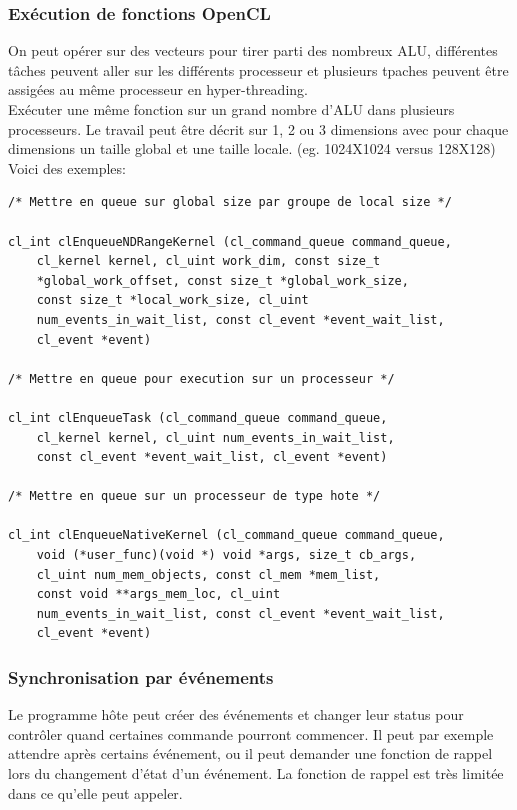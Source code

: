\documentclass[oneside]{book}
\begin{document}
\subsubsection{Exécution de fonctions OpenCL}
On peut opérer sur des vecteurs pour tirer parti des nombreux ALU, différentes tâches peuvent aller sur les différents processeur et plusieurs tpaches peuvent être assigées au même processeur en hyper-threading.\\

 Exécuter une même fonction sur un grand nombre d'ALU dans plusieurs processeurs. Le travail peut être décrit sur 1, 2 ou 3 dimensions avec pour chaque dimensions un taille global et une taille locale. (eg. 1024X1024 versus 128X128)\\
 
Voici des exemples:
\begin{lstlisting}
/* Mettre en queue sur global size par groupe de local size */

cl_int clEnqueueNDRangeKernel (cl_command_queue command_queue,
	cl_kernel kernel, cl_uint work_dim, const size_t
	*global_work_offset, const size_t *global_work_size,
	const size_t *local_work_size, cl_uint
	num_events_in_wait_list, const cl_event *event_wait_list,
	cl_event *event)

/* Mettre en queue pour execution sur un processeur */

cl_int clEnqueueTask (cl_command_queue command_queue,
	cl_kernel kernel, cl_uint num_events_in_wait_list,
	const cl_event *event_wait_list, cl_event *event)

/* Mettre en queue sur un processeur de type hote */

cl_int clEnqueueNativeKernel (cl_command_queue command_queue,
	void (*user_func)(void *) void *args, size_t cb_args,
	cl_uint num_mem_objects, const cl_mem *mem_list,
	const void **args_mem_loc, cl_uint
	num_events_in_wait_list, const cl_event *event_wait_list,
	cl_event *event)
\end{lstlisting}

\subsubsection{Synchronisation par événements}
Le programme hôte peut créer des événements et changer leur status pour contrôler quand certaines commande pourront commencer. Il peut par exemple attendre après certains événement, ou il peut demander une fonction de rappel lors du changement d'état d'un événement. La fonction de rappel est très limitée dans ce qu'elle peut appeler.\\
\end{document}
